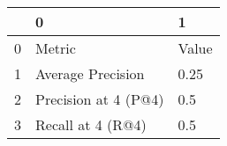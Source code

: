 \begin{tabular}{lll}
\toprule
{} &                     0 &      1 \\
\midrule
0 &                Metric &  Value \\
1 &     Average Precision &   0.25 \\
2 &  Precision at 4 (P@4) &    0.5 \\
3 &     Recall at 4 (R@4) &    0.5 \\
\bottomrule
\end{tabular}
